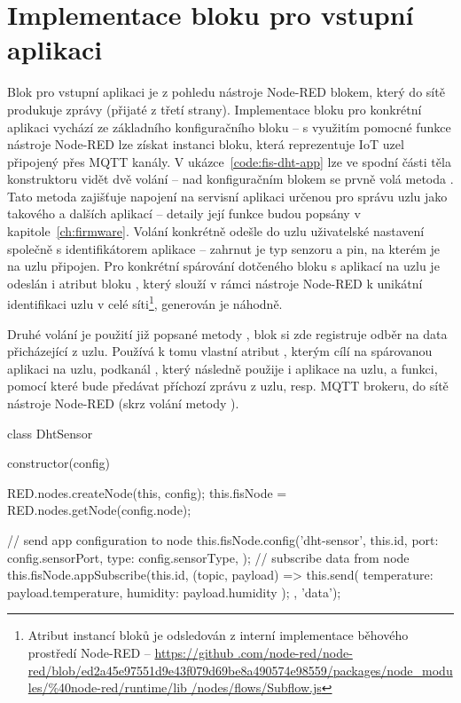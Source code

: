 \section{Implementace bloku pro vstupní aplikaci}\label{sec:implementace-bloku-pro-vstupni-aplikaci}
Blok pro vstupní aplikaci je z pohledu nástroje Node-RED blokem, který do sítě produkuje zprávy (přijaté z třetí
strany).
Implementace bloku pro konkrétní aplikaci vychází ze základního konfiguračního bloku -- s využitím pomocné funkce
nástroje Node-RED  lze získat instanci bloku, která reprezentuje IoT uzel připojený přes MQTT
kanály.
V ukázce~\ref{code:fis-dht-app} lze ve spodní části těla konstruktoru vidět dvě volání -- nad konfiguračním blokem se
prvně volá metoda .
Tato metoda zajišťuje napojení na servisní aplikaci určenou pro správu uzlu jako takového a dalších aplikací --
detaily její funkce budou popsány v kapitole~\ref{ch:firmware}.
Volání konkrétně odešle do uzlu uživatelské nastavení společně s identifikátorem aplikace  -- zahrnut
je typ senzoru a pin, na kterém je na uzlu připojen.
Pro konkrétní spárování dotčeného bloku s aplikací na uzlu je odeslán i atribut bloku , který slouží v
rámci nástroje Node-RED k unikátní identifikaci uzlu v celé síti\footnote{Atribut  instancí bloků je
odsledován z interní implementace běhového prostředí Node-RED -- \url{https://github
.com/node-red/node-red/blob/ed2a45e97551d9e43f079d69be8a490574e98559/packages/node_modules/\%40node-red/runtime/lib
/nodes/flows/Subflow.js}}, generován je náhodně.

Druhé volání je použití již popsané metody , blok si zde registruje odběr na data přicházející z
uzlu.
Používá k tomu vlastní atribut , kterým cílí na spárovanou aplikaci na uzlu, podkanál , který
následně použije i aplikace na uzlu, a funkci, pomocí které bude předávat příchozí zprávu z uzlu, resp. MQTT brokeru,
do sítě nástroje Node-RED (skrz volání metody ).

\begin{code}[
    language=Javascript,
    label=code:fis-dht-app,
    caption={Detail implementace vstupní aplikace (z hlediska centrálního uzlu) -- konkrétně se jedná o aplikaci pro
    senzory typu DHT měřící teplotu a vlhkost okolí. }
]
class DhtSensor {
    constructor(config) {
        RED.nodes.createNode(this, config);
        this.fisNode = RED.nodes.getNode(config.node);

        // send app configuration to node
        this.fisNode.config('dht-sensor', this.id, {
            port: config.sensorPort,
            type: config.sensorType,
        });
        // subscribe data from node
        this.fisNode.appSubscribe(this.id, (topic, payload) => {
            this.send({
                temperature: payload.temperature,
                humidity: payload.humidity
            });
        }, 'data');
    }
}
\end{code}

